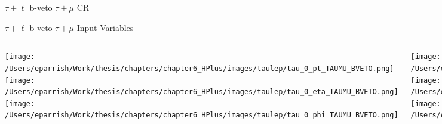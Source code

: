\documentclass[aspectratio=169,xcolor=table]{beamer}
\begin{document}
    \begin{frame}[c]{$\tau+\ell$ b-veto $\tau+\mu$ CR}
      \begin{table}
      \end{table}
    \end{frame}

    \begin{frame}[t]{$\tau+\ell$ b-veto $\tau+\mu$ Input Variables}
      \begin{columns}[t]
          \texttt{[image: /Users/eparrish/Work/thesis/chapters/chapter6\_HPlus/images/taulep/tau\_0\_pt\_TAUMU\_BVETO.png]}
          \texttt{[image: /Users/eparrish/Work/thesis/chapters/chapter6\_HPlus/images/taulep/tau\_0\_eta\_TAUMU\_BVETO.png]}
          \texttt{[image: /Users/eparrish/Work/thesis/chapters/chapter6\_HPlus/images/taulep/tau\_0\_phi\_TAUMU\_BVETO.png]}

          \texttt{[image: /Users/eparrish/Work/thesis/chapters/chapter6\_HPlus/images/taulep/met\_et\_TAUMU\_BVETO.png]}
          \texttt{[image: /Users/eparrish/Work/thesis/chapters/chapter6\_HPlus/images/taulep/met\_phi\_TAUMU\_BVETO.png]}
          \texttt{[image: /Users/eparrish/Work/thesis/chapters/chapter6\_HPlus/images/taulep/jet\_1\_pt\_TAUMU\_BVETO.png]}

          \texttt{[image: /Users/eparrish/Work/thesis/chapters/chapter6\_HPlus/images/taulep/bjet\_0\_pt\_TAUMU\_BVETO.png]}
          \texttt{[image: /Users/eparrish/Work/thesis/chapters/chapter6\_HPlus/images/taulep/bjet\_0\_eta\_TAUMU\_BVETO.png]}
          \texttt{[image: /Users/eparrish/Work/thesis/chapters/chapter6\_HPlus/images/taulep/bjet\_0\_phi\_TAUMU\_BVETO.png]}

          \texttt{[image: /Users/eparrish/Work/thesis/chapters/chapter6\_HPlus/images/taulep/tau\_0\_upsilon\_TAUMU\_BVETO.png]}
          \texttt{[image: /Users/eparrish/Work/thesis/chapters/chapter6\_HPlus/images/taulep/tau\_0\_charged\_tracks\_0\_pt\_TAUMU\_BVETO.png]}

      \end{columns}
    \end{frame}
\end{document}
